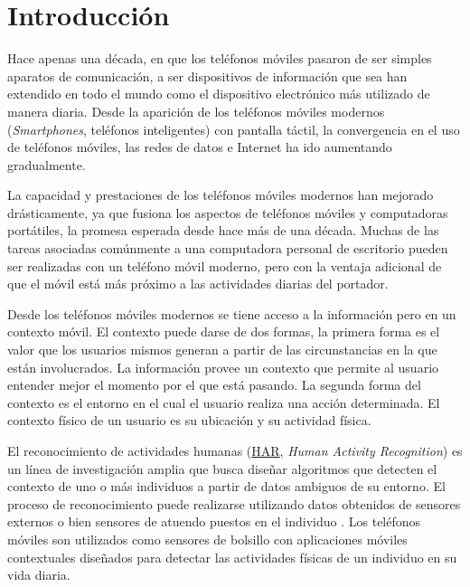 
\chapter{Introducción}

\label{chap:introduccion}

Hace apenas una década, en que los teléfonos móviles pasaron de ser
simples aparatos de comunicación, a ser dispositivos de información
que sea han extendido en todo el mundo como el dispositivo electrónico
más utilizado de manera diaria. Desde la aparición de los teléfonos
móviles modernos (\emph{Smartphones}, teléfonos inteligentes) con
pantalla táctil, la convergencia en el uso de teléfonos móviles, las
redes de datos e Internet ha ido aumentando gradualmente\cite{fling2009mobile}.

La capacidad y prestaciones de los teléfonos móviles modernos han
mejorado drásticamente, ya que fusiona los aspectos de teléfonos móviles
y computadoras portátiles, la promesa esperada desde hace más de una
década\cite{Tanenbaum2010}. Muchas de las tareas asociadas comúnmente
a una computadora personal de escritorio pueden ser realizadas con
un teléfono móvil moderno, pero con la ventaja adicional de que el
móvil está más próximo a las actividades diarias del portador.

Desde los teléfonos móviles modernos se tiene acceso a la información
pero en un contexto móvil. El contexto puede darse de dos formas,
la primera forma es el valor que los usuarios mismos generan a partir
de las circunstancias en la que están involucrados\cite{fling2009mobile}.
La información provee un contexto que permite al usuario entender
mejor el momento por el que está pasando. La segunda forma del contexto
es el entorno en el cual el usuario realiza una acción determinada\cite{fling2009mobile}.
El contexto físico de un usuario es su ubicación y su actividad física. 

El reconocimiento de actividades humanas (\hyperlink{abbr}{HAR},
\emph{Human Activity Recognition}) es un línea de investigación amplia
que busca diseñar algoritmos que detecten el contexto de uno o más
individuos a partir de datos ambiguos de su entorno\cite{Bao2004}.
El proceso de reconocimiento puede realizarse utilizando datos obtenidos
de sensores externos o bien sensores de atuendo puestos en el individuo
\cite{LaraLabrador2013}. Los teléfonos móviles son utilizados como
sensores de bolsillo con aplicaciones móviles contextuales diseñados
para detectar las actividades físicas de un individuo en su vida diaria. 

